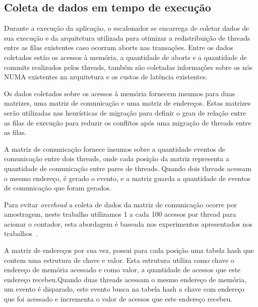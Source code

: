\documentclass[diss,capa]{texufpel}
\begin{document}
\subsection{Coleta de dados em tempo de execução}
\label{coleta}

Durante a execução da aplicação, o escalonador se encarrega de coletar dados de sua execução e da arquitetura utilizada para otimizar a redistribuição de threads entre as filas existentes caso ocorram aborts nas transações. Entre os dados coletados estão os acessos à memória, a quantidade de aborts e a quantidade de commits realizados pelos threads, também são coletadas informações sobre os nós NUMA existentes na arquitetura e os custos de latência existentes.

Os dados coletados sobre os acessos à memória fornecem insumos para duas matrizes, uma matriz de comunicação e uma matriz de endereços. Estas matrizes serão utilizadas nas heurísticas de migração para definir o grau de relação entre as filas de execução para reduzir os conflitos após uma migração de threads entre as filas.

A matriz de comunicação fornece insumos sobre a quantidade eventos de comunicação entre dois threads, onde cada posição da matriz representa a quantidade de comunicação entre pares de threads. Quando dois threads acessam o mesmo endereço, é gerado o evento, e a matriz guarda a quantidade de eventos de comunicação que foram gerados.

Para evitar \emph{overhead} a coleta de dados da matriz de comunicação ocorre por amostragem, neste trabalho utilizamos 1 a cada 100 acessos por thread para acionar o contador, esta abordagem é baseada nos experimentos apresentados nos trabalhos~\cite{pasqualin2020online}. 

A matriz de endereços por sua vez, possui para cada posição uma tabela hash que contem uma estrutura de chave e valor. Esta estrutura utiliza como chave o endereço de memória acessado e como valor, a quantidade de acessos que este endereço recebeu.Quando duas threads acessam o mesmo endereço de memória, um evento é disparado, este evento busca na tabela hash a chave com endereço que foi acessado e incrementa o valor de acessos que este endereço recebeu.


\end{document}
